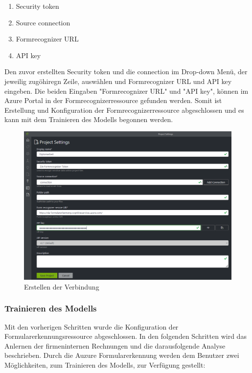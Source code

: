 \begin{enumerate}
    \item Security token
    \item Source connection
    \item Formrecognizer URL
    \item API key
\end{enumerate}

Den zuvor erstellten Security token und die connection im Drop-down Menü, der jeweilig zugöhiregn Zeile, auswählen und Formrecognizer URL und API key eingeben.
Die beiden Eingaben "Formrecognizer URL" und "API key", können im Azure Portal in der Formrecognizerressource gefunden werden. Somit ist 
Erstellung und Konfiguration der Formrecognizerressource abgeschlossen und es kann mit dem Trainieren des Modells begonnen werden.

\begin{figure}[h]
    \centering
    \includegraphics[scale=0.5]{sections/cloud-computing/images/formrecognizer-new-project.PNG}
    \caption{Erstellen der Verbindung}
    \label{fig:formrecognizer-security-token}
\end{figure}

\subsubsection{Trainieren des Modells}

Mit den vorherigen Schritten wurde die Konfiguration der Formularerkennungsressource abgeschlossen. In den folgenden Schritten wird das 
Anlernen der firmeninternen Rechnungen und die darausfolgende Analyse beschrieben.
Durch die Auzure Formularerkennung werden dem Benutzer zwei Möglichkeiten, zum Trainieren des Modells, zur Verfügung gestellt:

